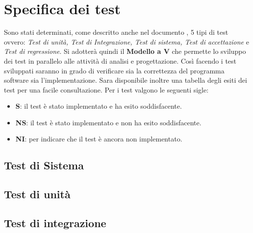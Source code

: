 \section{Specifica dei test}

Sono stati determinati, come descritto anche nel documento \NdP , 5 tipi di test ovvero: 
\textit{Test di unità, Test di Integrazione, Test di sistema, Test di accettazione} e \textit{Test di regressione}. 
Si adotterà quindi il \textbf{Modello a V} che permette lo sviluppo dei test in parallelo alle attività di analisi e progettazione. 
Così facendo i test sviluppati saranno in grado di verificare sia la correttezza del programma software sia l'implementazione. 
Sara disponibile inoltre una tabella degli esiti dei test per una facile consultazione.
Per i test valgono le seguenti sigle:

    \begin{itemize}
        \item \textbf{S}: il test è stato implementato e ha esito soddisfacente.
        \item \textbf{NS}: il test è stato implementato e non ha esito soddisfacente.
        \item \textbf{NI}: per indicare che il test è ancora non implementato.
    \end{itemize}
 
\subsection{Test di Sistema}


\newpage
\subsection{Test di unità}


\subsection{Test di integrazione}
